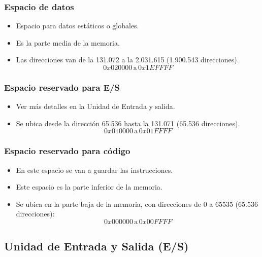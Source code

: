 \documentclass{article}
\begin{document}
\subsubsection{Espacio de datos}

\begin{itemize}
    \item Espacio para datos estáticos o globales.
    \item Es la parte media de la memoria.
    \item Las direcciones van de la 131.072 a la 2.031.615 (1.900.543 direcciones).
    \[
    0x020000 \, \text{a} \, 0x1EFFFF
    \]
\end{itemize}

\subsubsection{Espacio reservado para E/S}

\begin{itemize}
    \item Ver más detalles en la Unidad de Entrada y salida.
    \item Se ubica desde la dirección 65.536 hasta la 131.071 (65.536 direcciones).
    \[
    0x010000 \, \text{a} \, 0x01FFFF
    \]
\end{itemize}

\subsubsection{Espacio reservado para código}

\begin{itemize}
    \item En este espacio se van a guardar las instrucciones.
    \item Este espacio es la parte inferior de la memoria.
    \item Se ubica en la parte baja de la memoria, con direcciones de 0 a 65535 (65.536 direcciones):
    \[
    0x000000 \, \text{a} \, 0x00FFFF
    \]
\end{itemize}


\subsection{Unidad de Entrada y Salida (E/S)}
\end{document}
